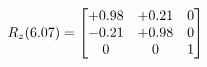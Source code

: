 \documentclass[preview]{standalone}
\begin{document}
\begin{align*}
\special{dvisvgm:raw <g id='unique000'>}R_{z}(6.07) = \begin{bmatrix}+0.98 & +0.21 & 0 \\-0.21 & +0.98 & 0 \\0 & 0 & 1\end{bmatrix}\special{dvisvgm:raw </g>}
\end{align*}
\end{document}
